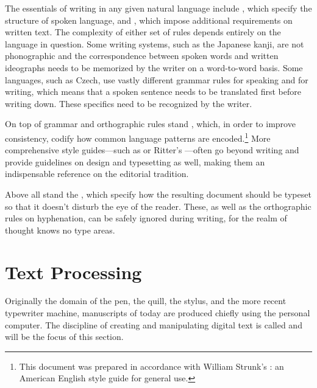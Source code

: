 \documentclass{book}
\begin{document}
The essentials of writing in any given natural language include , which specify the structure of spoken language, and
, which impose additional
requirements on written text. The complexity of either set of rules depends
entirely on the language in question. Some writing systems, such as the Japanese
kanji, are not phonographic and the correspondence between spoken words and
written ideographs needs to be memorized by the writer on a word-to-word
basis. Some languages, such as Czech, use vastly different grammar rules for
speaking and for writing, which means that a spoken sentence needs to be
translated first before writing down. These specifics need to be recognized by
the writer.

On top of grammar and orthographic rules stand , which, in order to improve consistency, codify how common language
patterns are encoded.\footnote{
  This document was prepared in accordance with William Strunk's : an American English style guide for general use.
} More comprehensive style guides---such as 
or Ritter's ---often go beyond writing and provide
guidelines on design and typesetting as well, making them an indispensable
reference on the editorial tradition.

Above all stand the , which
specify how the resulting document should be typeset so that it doesn't disturb
the eye of the reader. These, as well as the orthographic rules on hyphenation,
can be safely ignored during writing, for the realm of thought knows no type
areas.


\section{Text Processing}
Originally the domain of the pen, the quill, the stylus, and the more recent
typewriter machine, manuscripts of today are produced chiefly using the personal
computer. The discipline of creating and manipulating digital text is called
 and will be the focus of this section.
\end{document}
